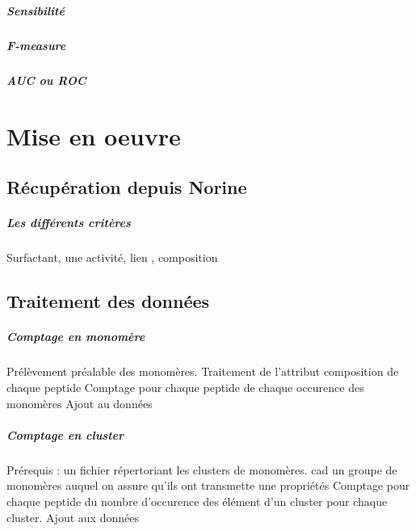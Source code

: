 \documentclass[a4paper,10pt]{report}
\begin{document}
	      ~\\
	      
	     
	     \paragraph{Sensibilité}
	     
	     \paragraph{F-measure}
	     
	     \paragraph{AUC ou ROC}
		
  
  \chapter{Mise en oeuvre}

  
    \section{Récupération depuis Norine}
    
	\paragraph{Les différents critères}
	    Surfactant, une activité, lien , composition
	    
   
    \section{Traitement des données}
	
	\paragraph{Comptage en monomère}
	    Prélèvement préalable des monomères.
	    Traitement de l'attribut composition de chaque peptide
	    Comptage pour chaque peptide de chaque occurence des monomères
	    Ajout au données
	    
	\paragraph{Comptage en cluster}
	    Prérequis : un fichier répertoriant les clusters de monomères.
	    cad un groupe de monomères auquel on assure qu'ils ont transmette une propriétés
	    Comptage pour chaque peptide du nombre d'occurence des élément d'un cluster pour chaque cluster.
	    Ajout aux données
	  
\end{document}
